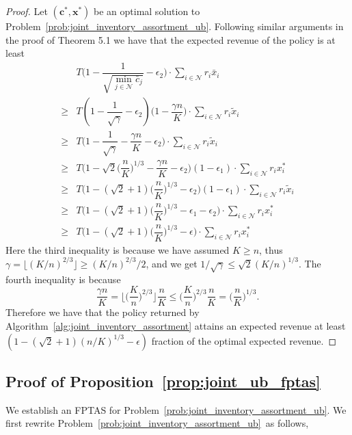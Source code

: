\documentclass[mnsc,non-blindrev]{informs3}
\theoremstyle{definition}
\begin{document}
\begin{appendices}{\Large{}}
{\begin{proof}
Let $(\bm{c}^*,\bm{x}^*)$ be an optimal solution to Problem~\eqref{prob:joint_inventory_assortment_ub}. Following similar arguments in the proof of Theorem 5.1 we have that the expected revenue of the policy is at least
\begin{align*}
&T\Big(1-\dfrac{1}{\sqrt{\min_{j\in\mathcal{N}}\bar{c}_j}}-\epsilon_2\Big)\cdot \sum_{i\in\mathcal{N}}r_i\bar{x}_i\\
\geq&T\left(1-\dfrac{1}{\sqrt{\gamma}}-\epsilon_2\right)\Big(1-\dfrac{\gamma n}{K}\Big)\cdot\sum_{i\in\mathcal{N}}r_i\tilde{x}_i\\
\geq&T\Big(1-\dfrac{1}{\sqrt{\gamma}}-\dfrac{\gamma n}{K}-\epsilon_2\Big)\cdot \sum_{i\in\mathcal{N}}r_i\tilde{x}_i\\
\geq & T\Big(1-\sqrt{2}\Big(\dfrac{n}{K}\Big)^{1/3}-\dfrac{\gamma n}{K}-\epsilon_2\Big)(1-\epsilon_1)\cdot\sum_{i\in\mathcal{N}}r_ix_i^*\\
\geq&T\Big(1-(\sqrt{2}+1)\Big(\dfrac{n}{K}\Big)^{1/3}-\epsilon_2\Big)(1-\epsilon_1)\cdot \sum_{i\in\mathcal{N}}r_i\tilde{x}_i\\
\geq &T\Big(1-(\sqrt{2}+1)\Big(\dfrac{n}{K}\Big)^{1/3}-\epsilon_1-\epsilon_2\Big)\cdot\sum_{i\in\mathcal{N}}r_ix_i^*\\
\geq &T\Big(1-(\sqrt{2}+1)\Big(\dfrac{n}{K}\Big)^{1/3}-\epsilon\Big)\cdot\sum_{i\in\mathcal{N}}r_ix_i^*
\end{align*}
Here the third inequality is because we have assumed $K\geq n$, thus $\gamma=\lfloor(K/n)^{2/3}\rfloor\geq (K/n)^{2/3}/2$, and we get $1/\sqrt{\gamma}\leq \sqrt{2}(K/n)^{1/3}$. The fourth inequality is because
\begin{equation*}
\dfrac{\gamma n}{K}=\Big\lfloor\Big(\dfrac{K}{n}\Big)^{2/3}\Big\rfloor \dfrac{n}{K}\leq \Big(\dfrac{K}{n}\Big)^{2/3}\dfrac{n}{K}=\Big(\dfrac{n}{K}\Big)^{1/3}.
\end{equation*}
Therefore we have that the policy returned by Algorithm~\ref{alg:joint_inventory_assortment} attains an expected revenue at least $(1-(\sqrt{2}+1)(n/K)^{1/3}-\epsilon)$ fraction of the optimal expected revenue.
\end{proof}



\subsection{Proof of Proposition~\ref{prop:joint_ub_fptas}}\label{sec:prop:joint_ub_fptas}

We establish an FPTAS for Problem~\eqref{prob:joint_inventory_assortment_ub}. We first rewrite Problem~\eqref{prob:joint_inventory_assortment_ub}~as follows,

}
\end{appendices}
\end{document}
